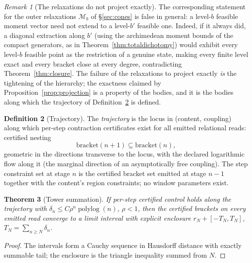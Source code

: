 \documentclass[11pt]{article}
\newtheorem{theorem}{Theorem}[section]
\theoremstyle{definition}
\newtheorem{definition}[theorem]{Definition}
\theoremstyle{remark}
\newtheorem{remark}[theorem]{Remark}
\begin{document}
\begin{remark}[The relaxations do not project exactly]
\label{rem:projectionscope}
The corresponding statement for the outer relaxations $\mathcal M_b$
of \S\ref{sec:cones} is false in general: a level-$b$ feasible moment
vector need not extend to a level-$b'$ feasible one.  Indeed, if it
always did, a diagonal extraction along $b'$ (using the archimedean
moment bounds of the compact generators, as in
Theorem~\ref{thm:totaldichotomy}) would exhibit every level-$b$
feasible point as the restriction of a genuine state, making every
finite level exact and every bracket close at every degree,
contradicting Theorem~\ref{thm:closure}.  The failure of the
relaxations to project exactly \emph{is} the tightening of the
hierarchy; the exactness claimed by
Proposition~\ref{prop:projection} is a property of the bodies, and it
is the bodies along which the trajectory of
Definition~\ref{def:trajectory} is defined.
\end{remark}

\begin{definition}[Trajectory]\label{def:trajectory}
The \emph{trajectory} is the locus in (content, coupling) along which
per-step contraction certificates exist for all emitted relational
reads: certified nesting
\[
\mathrm{bracket}(n{+}1) \subseteq \mathrm{bracket}(n),
\]
geometric in the directions transverse to the
locus, with the declared logarithmic flow along it (the marginal
direction of an asymptotically free coupling).  The step constraint set
at stage $n$ is the certified bracket set emitted at stage $n{-}1$
together with the content's region constraints; no window parameters
exist.
\end{definition}

\begin{theorem}[Tower summation]\label{thm:tower}
If per-step certified control holds along the trajectory with
$\delta_n \le C\rho^n \operatorname{polylog}(n)$, $\rho < 1$, then the
certified brackets on every emitted read converge to a limit interval
with explicit enclosure $r_N + [-T_N, T_N]$, $T_N = \sum_{n \ge N}
\delta_n$.
\end{theorem}
\begin{proof}
The intervals form a Cauchy sequence in Hausdorff distance with exactly
summable tail; the enclosure is the triangle inequality summed from $N$.
\end{proof}
\end{document}
